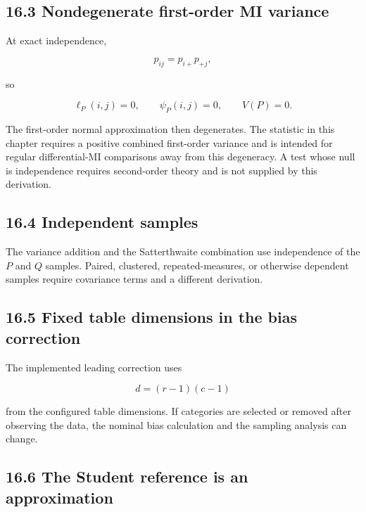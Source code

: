 \documentclass[
  11pt]{article}
\begin{document}
\subsection{16.3 Nondegenerate first-order MI
variance}\label{nondegenerate-first-order-mi-variance}

At exact independence,

\begin{equation}
p_{ij}=p_{i+}p_{+j},
\end{equation}

so

\begin{equation}
\ell_P(i,j)=0,
\qquad
\psi_P(i,j)=0,
\qquad
V(P)=0.
\end{equation}

The first-order normal approximation then degenerates. The statistic in
this chapter requires a positive combined first-order variance and is
intended for regular differential-MI comparisons away from this
degeneracy. A test whose null is independence requires second-order
theory and is not supplied by this derivation.

\subsection{16.4 Independent samples}\label{independent-samples}

The variance addition and the Satterthwaite combination use independence
of the \(P\) and \(Q\) samples. Paired, clustered, repeated-measures, or
otherwise dependent samples require covariance terms and a different
derivation.

\subsection{16.5 Fixed table dimensions in the bias
correction}\label{fixed-table-dimensions-in-the-bias-correction}

The implemented leading correction uses

\begin{equation}
d=(r-1)(c-1)
\end{equation}

from the configured table dimensions. If categories are selected or
removed after observing the data, the nominal bias calculation and the
sampling analysis can change.

\subsection{16.6 The Student reference is an
approximation}\label{the-student-reference-is-an-approximation}
\end{document}
